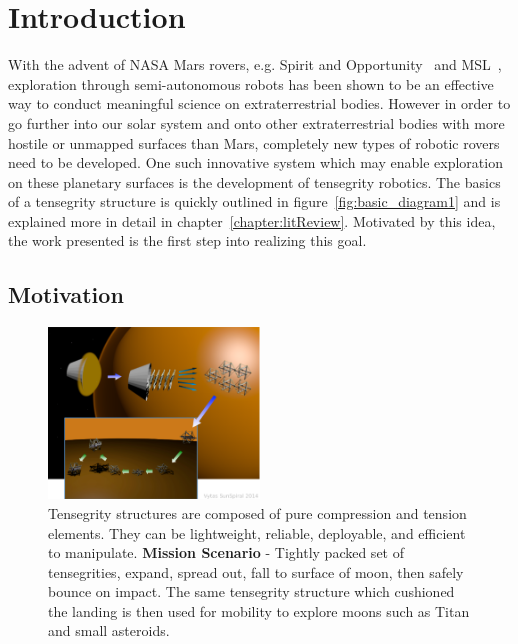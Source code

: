 \chapter{Introduction}

With the advent of NASA Mars rovers, e.g. Spirit and Opportunity~\cite{maimone2007overview} and MSL~\cite{grotzinger2012mars}, exploration through semi-autonomous robots has been shown to be an effective way to conduct meaningful science on extraterrestrial bodies. 
However in order to go further into our solar system and onto other extraterrestrial bodies with more hostile or unmapped surfaces than Mars, completely new types of robotic rovers need to be developed.
One such innovative system which may enable exploration on these planetary surfaces is the development of tensegrity robotics.
The basics of a tensegrity structure is quickly outlined in figure~\ref{fig:basic_diagram1} and is explained more in detail in chapter~\ref{chapter:litReview}.
Motivated by this idea, the work presented is the first step into realizing this goal.

\section{Motivation}

\begin{figure}[htb]
   \centering
   \includegraphics[width=0.5\textwidth]{tex/img/fig_aeroshell_summary} 
   \caption{{Tensegrity structures are composed of pure compression and tension elements. They can be lightweight, reliable, deployable, and efficient to manipulate. {\bf Mission Scenario} - Tightly packed set of tensegrities, expand, spread out, fall to surface of moon, then safely bounce on impact. The same tensegrity structure which cushioned the landing is then used for mobility to explore moons such as Titan and small asteroids.}}
   \label{fig:unpack}
\end{figure}

